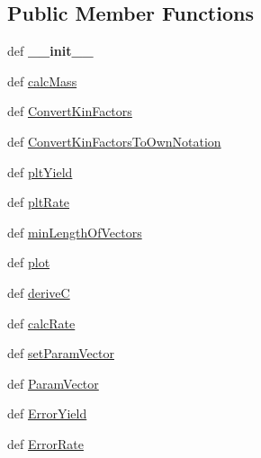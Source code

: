 \subsection*{\-Public \-Member \-Functions}
\begin{DoxyCompactItemize}
\item 
\hypertarget{classFit__one__run_1_1ArrheniusModelAlternativeNotation2_ab0e6cc19bc075aceb03286fdf1178b33}{def {\bfseries \-\_\-\-\_\-init\-\_\-\-\_\-}}\label{classFit__one__run_1_1ArrheniusModelAlternativeNotation2_ab0e6cc19bc075aceb03286fdf1178b33}

\item 
def \hyperlink{classFit__one__run_1_1ArrheniusModelAlternativeNotation2_ad2b7981d11c82b7fb90f476396655f3f}{calc\-Mass}
\item 
def \hyperlink{classFit__one__run_1_1ArrheniusModelAlternativeNotation2_a4f6e2eb68a60c1dbdbb6176ad7cf508a}{\-Convert\-Kin\-Factors}
\item 
def \hyperlink{classFit__one__run_1_1ArrheniusModelAlternativeNotation2_ac12a7c92f1991306e31ff67564de4126}{\-Convert\-Kin\-Factors\-To\-Own\-Notation}
\item 
def \hyperlink{classFit__one__run_1_1Model_aa304b32155938a713c33f0dc03a135f3}{plt\-Yield}
\item 
def \hyperlink{classFit__one__run_1_1Model_a9c28d95902adf00f5aaa642f0919fc61}{plt\-Rate}
\item 
def \hyperlink{classFit__one__run_1_1Model_a26fc879ca33c9171ebb4a97bc4b0c46b}{min\-Length\-Of\-Vectors}
\item 
def \hyperlink{classFit__one__run_1_1Model_a98159c954f1f1be2a34be3ea53d11493}{plot}
\item 
def \hyperlink{classFit__one__run_1_1Model_ace9df4177c5ae753dbe190e2f8268149}{derive\-C}
\item 
def \hyperlink{classFit__one__run_1_1Model_a07ae4534de2a6ef241d71facdffb227e}{calc\-Rate}
\item 
def \hyperlink{classFit__one__run_1_1Model_a174aec9b05dbe01ec103f7ba75d6516c}{set\-Param\-Vector}
\item 
def \hyperlink{classFit__one__run_1_1Model_a3c9239f0ac062fdae0bda395636c0372}{\-Param\-Vector}
\item 
def \hyperlink{classFit__one__run_1_1Model_aa2bc4ba19704350fb2ff441734b51b10}{\-Error\-Yield}
\item 
def \hyperlink{classFit__one__run_1_1Model_aad63c345c343f0c7d1cf20135dc0a0e5}{\-Error\-Rate}
\end{DoxyCompactItemize}

